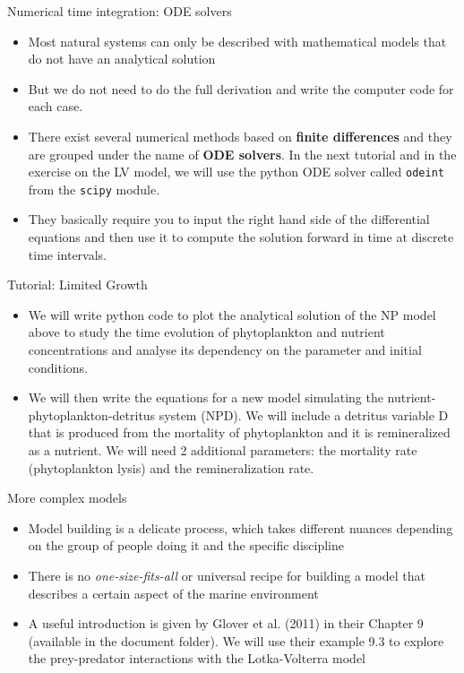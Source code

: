 \documentclass[english,aspectratio=169]{beamer}
\begin{document}
\begin{frame}{Numerical time integration: ODE solvers}
\begin{itemize}
\item Most natural systems can only be described with mathematical models that do not have an analytical solution
\item But we do not need to do the full derivation and write the computer code for each case.
\item There exist several numerical methods based on \textbf{finite differences} and they are grouped under the name of \textbf{ODE solvers}. In the next tutorial and in the exercise on the LV model, we will use the python ODE solver called \texttt{odeint} from the \texttt{scipy} module.
\item They basically require you to input the right hand side of the differential equations and then use it to compute the solution forward in time at discrete time intervals.
\end{itemize}
\end{frame}
\begin{frame}{Tutorial: Limited Growth}
\begin{itemize}
\item We will write python code to plot the analytical solution of the NP model above to study the time evolution of phytoplankton and nutrient concentrations and analyse its dependency on the parameter and initial conditions.
\item We will then write the equations for a new model simulating the nutrient-phytoplankton-detritus system (NPD). We will include a detritus variable D that is produced from the mortality of phytoplankton and it is remineralized as a nutrient. We will need 2 additional parameters: the mortality rate (phytoplankton lysis) and the remineralization rate.
\end{itemize}
\end{frame}

\begin{frame}{More complex models}
\begin{itemize}
\item Model building is a delicate process, which takes different nuances depending on the group of people doing it and the specific discipline
\item There is no \emph{one-size-fits-all} or universal recipe for building a model that describes a certain aspect of the marine environment
\item A useful introduction is given by Glover et al. (2011) in their Chapter 9 (available in the document folder). We will use their example 9.3 to explore the prey-predator interactions with the Lotka-Volterra model 
\end{itemize}
\end{frame}
\end{document}
